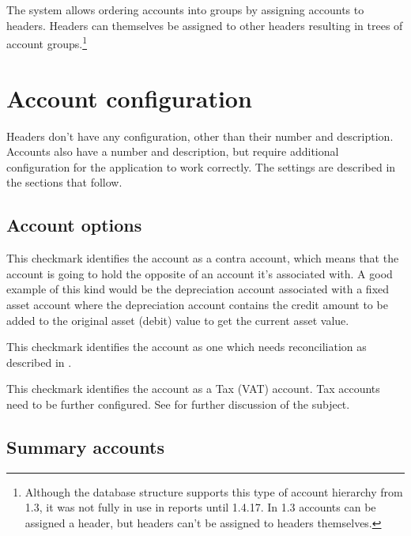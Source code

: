 The system allows ordering accounts into groups by assigning accounts to headers. Headers
can themselves be assigned to other headers resulting in trees of account groups.\footnote{Although the
         database structure supports this type of account hierarchy from  1.3, it was not fully in use in reports until  1.4.17. In 1.3 accounts can be assigned a header,
but headers can't be assigned to headers themselves.}



\section{Account configuration}
\label{sec-coa-account-configuration}

Headers don't have any configuration, other than their number and description. Accounts also
have a number and description, but require additional configuration for the application to work
correctly. The settings are described in the sections that follow.

\subsection{Account options}
\label{sec-coa-account-options}
\begin{description}[style=nextline]
\item[Contra] This checkmark identifies the account as a \gls{contra} account, which means
   that the account is going to hold the opposite of an account it's associated with.
   A good example of this kind would be the depreciation account associated with a fixed
   asset account where the depreciation account contains the credit amount to be added to
   the original asset (debit) value to get the current asset value.
\item[Recon] This checkmark identifies the account as one which needs reconciliation as
   described in .
\item[Tax] This checkmark identifies the account as a Tax (VAT) account. Tax accounts need
   to be further configured. See  for further discussion of the
   subject.
   \label{item:AccountOptionsTax}
\end{description}

\subsection{Summary accounts}
\label{subsec-coa-summary-accounts}

